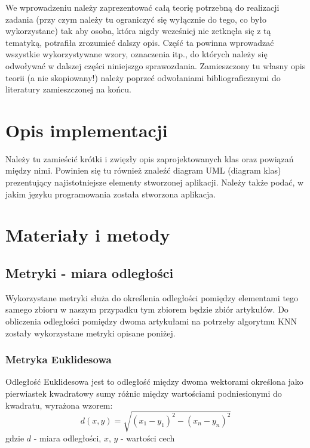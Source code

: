 \documentclass{classrep}
\begin{document}
\newline \newline
{\color{blue}
We wprowadzeniu należy zaprezentować całą teorię potrzebną do realizacji
zadania (przy czym należy tu ograniczyć się wyłącznie do tego, co było
wykorzystane) tak aby osoba, która nigdy wcześniej nie zetknęła się z tą
tematyką, potrafiła zrozumieć dalszy opis. Część ta powinna wprowadzać
wszystkie wykorzystywane wzory, oznaczenia itp., do których należy się
odwoływać w dalszej części niniejszgo sprawozdania. Zamieszczony tu własny
opis teorii (a nie skopiowany!) należy poprzeć odwołaniami bibliograficznymi
do literatury zamieszczonej na końcu. }

\section{Opis implementacji}
{\color{blue}
Należy tu zamieścić krótki i zwięzły opis zaprojektowanych klas oraz powiązań
między nimi. Powinien się tu również znaleźć diagram UML  (diagram klas)
prezentujący najistotniejsze elementy stworzonej aplikacji. Należy także
podać, w jakim języku programowania została stworzona aplikacja. }

\section{Materiały i metody}

\subsection{Metryki - miara odległości}
Wykorzystane metryki służa do określenia odległości pomiędzy elementami tego samego zbioru w naszym przypadku tym
zbiorem będzie zbiór artykułów. Do obliczenia odległości pomiędzy dwoma artykułami na potrzeby algorytmu KNN zostały
wykorzystane metryki opisane poniżej.

\subsubsection{Metryka Euklidesowa}
Odległość Euklidesowa jest to odległość między dwoma wektorami określona jako pierwiastek kwadratowy sumy różnic między
wartościami podniesionymi do kwadratu, wyrażona wzorem:
\begin{equation}
    d(x,y)=\sqrt{(x_{1}-y_{1})^{2}-(x_{n}-y_{n})^{2}}
\end{equation}
gdzie $d$ - miara odległości, $x$, $y$ - wartości cech
\end{document}
